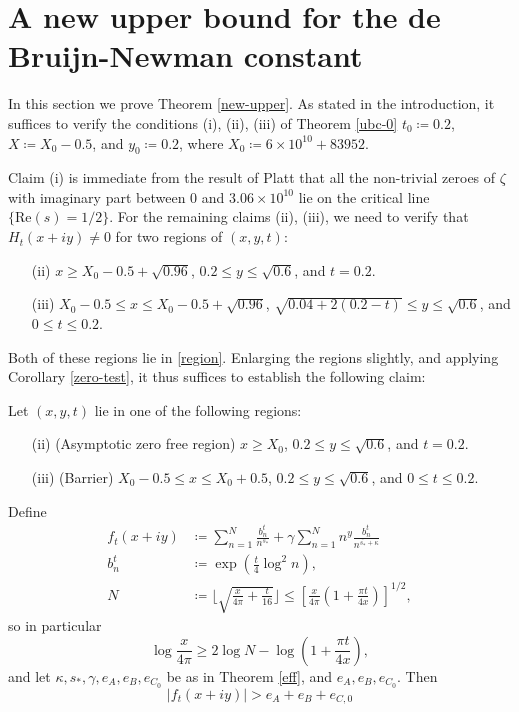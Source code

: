 \section{A new upper bound for the de Bruijn-Newman constant}\label{newup-sec}

In this section we prove Theorem \ref{new-upper}.  As stated in the introduction, it suffices to verify the conditions (i), (ii), (iii) of Theorem \ref{ubc-0} $t_0 \coloneqq 0.2$, $X \coloneqq X_0-0.5$, and $y_0 \coloneqq 0.2$, where $X_0 \coloneqq 6 \times 10^{10} + 83952$.  

Claim (i) is immediate from the result of Platt \cite{platt} that all the non-trivial zeroes of $\zeta$ with imaginary part between $0$ and $3.06 \times 10^{10}$ lie on the critical line $\{ \mathrm{Re}(s) = 1/2\}$.  For the remaining claims (ii), (iii), we need to verify that $H_t(x+iy) \neq 0$ for two regions of $(x,y,t)$:
\begin{itemize}
\item[(ii)]  $x \geq X_0 - 0.5 + \sqrt{0.96}$, $0.2 \leq y \leq \sqrt{0.6}$, and $t = 0.2$. 
\item[(iii)]  $X_0 - 0.5 \leq x \leq X_0 - 0.5 + \sqrt{0.96}$, $\sqrt{0.04 + 2(0.2-t)} \leq y \leq \sqrt{0.6}$, and $0 \leq t \leq 0.2$.
\end{itemize}
Both of these regions lie in \eqref{region}.  Enlarging the regions slightly, and applying Corollary \ref{zero-test}, it thus suffices to establish the following claim:

\begin{proposition}\label{sweep}  Let $(x,y,t)$ lie in one of the following regions:
\begin{itemize}
\item[(ii)] (Asymptotic zero free region) $x \geq X_0$, $0.2 \leq y \leq \sqrt{0.6}$, and $t = 0.2$.
\item[(iii)] (Barrier)  $X_0 - 0.5 \leq x \leq X_0 + 0.5$, $0.2 \leq y \leq \sqrt{0.6}$, and $0 \leq t \leq 0.2$.
\end{itemize}
Define
\begin{align*}
f_t(x+iy) &\coloneqq \sum_{n=1}^N \frac{b_n^t}{n^{s_*}} + \gamma \sum_{n=1}^N n^y \frac{b_n^t}{n^{\overline{s_*} + \kappa}}\\
b_n^t &\coloneqq \exp( \frac{t}{4} \log^2 n),\\
N &\coloneqq \lfloor \sqrt{\frac{x}{4\pi} + \frac{t}{16}} \rfloor \leq [\frac{x}{4\pi} (1 + \frac{\pi t}{4x})]^{1/2},
\end{align*}
so in particular
\begin{equation}\label{logx}
 \log \frac{x}{4\pi} \geq 2 \log N - \log(1 + \frac{\pi t}{4x}),
\end{equation}
and let $\kappa, s_*, \gamma, e_A, e_B, e_{C_0}$ be as in Theorem \ref{eff}, and $e_A, e_B, e_{C_0}$.  Then
\begin{equation}\label{bbb}
|f_t(x+iy)| > e_A + e_B + e_{C,0} 
\end{equation}
\end{proposition}

